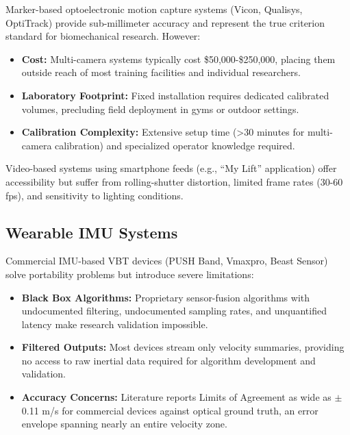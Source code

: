 Marker-based optoelectronic motion capture systems (Vicon, Qualisys, OptiTrack) provide sub-millimeter accuracy and represent the true criterion standard for biomechanical research. However:

\begin{itemize}
    \item \textbf{Cost:} Multi-camera systems typically cost \$50,000-\$250,000, placing them outside reach of most training facilities and individual researchers.

    \item \textbf{Laboratory Footprint:} Fixed installation requires dedicated calibrated volumes, precluding field deployment in gyms or outdoor settings.

    \item \textbf{Calibration Complexity:} Extensive setup time (>30 minutes for multi-camera calibration) and specialized operator knowledge required.
\end{itemize}

Video-based systems using smartphone feeds (e.g., ``My Lift'' application) offer accessibility but suffer from rolling-shutter distortion, limited frame rates (30-60 fps), and sensitivity to lighting conditions.

\subsection{Wearable IMU Systems}

Commercial IMU-based VBT devices (PUSH Band, Vmaxpro, Beast Sensor) solve portability problems but introduce severe limitations:

\begin{itemize}
    \item \textbf{Black Box Algorithms:} Proprietary sensor-fusion algorithms with undocumented filtering, undocumented sampling rates, and unquantified latency make research validation impossible.

    \item \textbf{Filtered Outputs:} Most devices stream only velocity summaries, providing no access to raw inertial data required for algorithm development and validation.

    \item \textbf{Accuracy Concerns:} Literature reports Limits of Agreement as wide as $\pm$0.11 m/s for commercial devices against optical ground truth, an error envelope spanning nearly an entire velocity zone.
\end{itemize}

